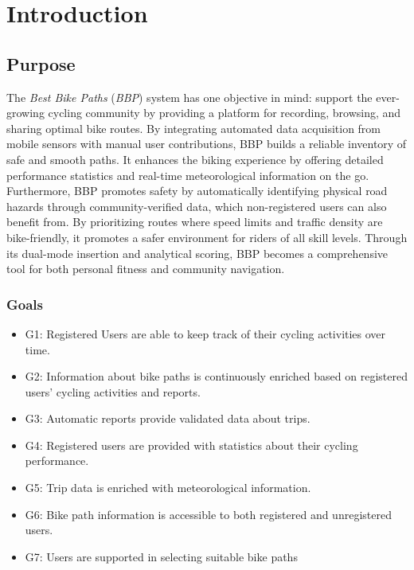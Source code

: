 \section{Introduction}
\subsection{Purpose} %
The \textit{Best Bike Paths} (\textit{BBP}) system has one objective in mind: support the ever-growing cycling community by providing a platform for recording, browsing, and sharing optimal bike routes. By integrating automated data acquisition from mobile sensors with manual user contributions, BBP builds a reliable inventory of safe and smooth paths. It enhances the biking experience by offering detailed performance statistics and real-time meteorological information on the go. Furthermore, BBP promotes safety by automatically identifying physical road hazards through community-verified data, which non-registered users can also benefit from. By prioritizing routes where speed limits and traffic density are bike-friendly, it promotes a safer environment for riders of all skill levels. Through its dual-mode insertion and analytical scoring, BBP becomes a comprehensive tool for both personal fitness and community navigation.

\subsubsection{Goals} %
\begin{itemize}
    \item G1: Registered Users are able to keep track of their cycling activities over time.
    \item G2: Information about bike paths is continuously enriched based on registered users’ cycling activities and reports.
    \item G3: Automatic reports provide validated data about trips.
    \item G4: Registered users are provided with statistics about their cycling performance.
    \item G5: Trip data is enriched with meteorological information.
    \item G6: Bike path information is accessible to both registered and unregistered users.
    \item G7: Users are supported in selecting suitable bike paths
\end{itemize}

